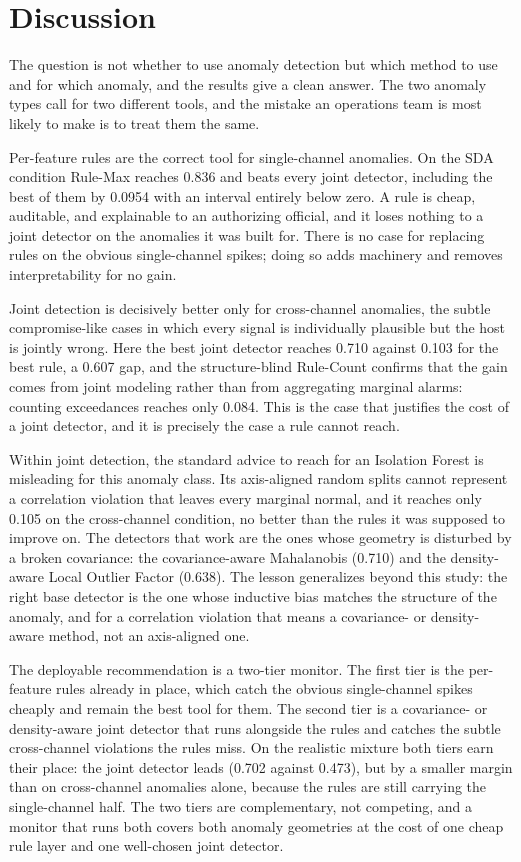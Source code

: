\documentclass[journal]{IEEEtran}
\begin{document}
\section{Discussion}
The question is not whether to use anomaly detection but which method to use and for which anomaly,
and the results give a clean answer. The two anomaly types call for two different tools, and the
mistake an operations team is most likely to make is to treat them the same.

Per-feature rules are the correct tool for single-channel anomalies. On the SDA condition Rule-Max
reaches 0.836 and beats every joint detector, including the best of them by 0.0954 with an interval
entirely below zero. A rule is cheap, auditable, and explainable to an authorizing official, and it
loses nothing to a joint detector on the anomalies it was built for. There is no case for replacing
rules on the obvious single-channel spikes; doing so adds machinery and removes interpretability for
no gain.

Joint detection is decisively better only for cross-channel anomalies, the subtle compromise-like
cases in which every signal is individually plausible but the host is jointly wrong. Here the best
joint detector reaches 0.710 against 0.103 for the best rule, a 0.607 gap, and the structure-blind
Rule-Count confirms that the gain comes from joint modeling rather than from aggregating marginal
alarms: counting exceedances reaches only 0.084. This is the case that justifies the cost of a joint
detector, and it is precisely the case a rule cannot reach.

Within joint detection, the standard advice to reach for an Isolation Forest is misleading for this
anomaly class. Its axis-aligned random splits cannot represent a correlation violation that leaves
every marginal normal, and it reaches only 0.105 on the cross-channel condition, no better than the
rules it was supposed to improve on. The detectors that work are the ones whose geometry is
disturbed by a broken covariance: the covariance-aware Mahalanobis (0.710) and the density-aware
Local Outlier Factor (0.638). The lesson generalizes beyond this study: the right base detector is
the one whose inductive bias matches the structure of the anomaly, and for a correlation violation
that means a covariance- or density-aware method, not an axis-aligned one.

The deployable recommendation is a two-tier monitor. The first tier is the per-feature rules already
in place, which catch the obvious single-channel spikes cheaply and remain the best tool for them.
The second tier is a covariance- or density-aware joint detector that runs alongside the rules and
catches the subtle cross-channel violations the rules miss. On the realistic mixture both tiers earn
their place: the joint detector leads (0.702 against 0.473), but by a smaller margin than on
cross-channel anomalies alone, because the rules are still carrying the single-channel half. The two
tiers are complementary, not competing, and a monitor that runs both covers both anomaly geometries
at the cost of one cheap rule layer and one well-chosen joint detector.
\end{document}
